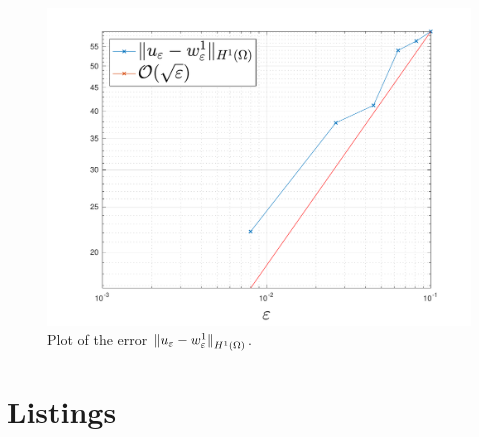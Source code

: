 \begin{example}
	\begin{figure}[h!tb]
	\includegraphics[width=\textwidth]{src/img/error.pdf}
	\caption{Plot of the error $\norm[0]{u_\varepsilon - w_\varepsilon^1}_{H^1(\Omega)}$.}
	\label{fig:error}
	\end{figure}
\end{example}
\appendix

\section{Listings}


\printbibliography

